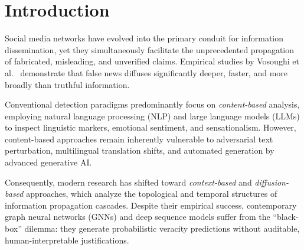 \documentclass[10pt,twocolumn]{article}
\begin{document}
\vspace{1em}

\section{Introduction}

Social media networks have evolved into the primary conduit for information dissemination, yet they simultaneously facilitate the unprecedented propagation of fabricated, misleading, and unverified claims. Empirical studies by Vosoughi et al.~\cite{vosoughi2018spread} demonstrate that false news diffuses significantly deeper, faster, and more broadly than truthful information. 

Conventional detection paradigms predominantly focus on \textit{content-based} analysis, employing natural language processing (NLP) and large language models (LLMs) to inspect linguistic markers, emotional sentiment, and sensationalism. However, content-based approaches remain inherently vulnerable to adversarial text perturbation, multilingual translation shifts, and automated generation by advanced generative AI. 

Consequently, modern research has shifted toward \textit{context-based} and \textit{diffusion-based} approaches, which analyze the topological and temporal structures of information propagation cascades. Despite their empirical success, contemporary graph neural networks (GNNs) and deep sequence models suffer from the ``black-box'' dilemma: they generate probabilistic veracity predictions without auditable, human-interpretable justifications.
\end{document}
